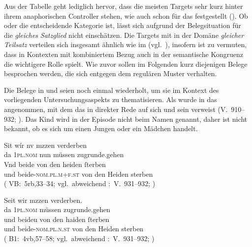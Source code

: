 Aus der Tabelle geht lediglich hervor, dass die meisten Targets sehr kurz
hinter ihrem anaphorischen Controller stehen, wie auch schon für das
\CAO{} festgestellt (). Ob  oder
 die entscheidende Kategorie ist, lässt sich aufgrund der
Belegsituation für die  \emph{gleiches Satzglied} nicht
einschätzen. Die Targets mit  in der Domäne \emph{gleicher
Teilsatz} verteilen sich insgesamt ähnlich wie im
\CAO{} (vgl.~), insofern ist zu vermuten, dass in
Kontexten mit kombiniertem Bezug auch in der \KC{} semantische
Kongruenz die wichtigere Rolle spielt. Wie zuvor
sollen im Folgenden kurz diejenigen Belege besprochen werden, die sich entgegen
dem regulären Muster verhalten.

Die Belege in  und  seien noch einmal
wiederholt, um sie im Kontext des vorliegenden Unter\-suchungsaspekts zu
thematisieren. Als  wurde in  das
   angenommen, mit dem das 
 in direkter Rede auf sich und sein  
verweist (V.~910--932; \cite[98]{schroeder1895}). Das Kind wird in der Episode
nicht beim Namen genannt, daher ist nicht bekannt, ob es sich um einen Jungen
oder ein Mädchen handelt.

\begin{exe}
\ex \label{ex:wipkindelin2}
	\begin{xlist}
	\ex \label{ex:wipkindelin2_1}
		\gll Sit wír nv mzzen verderben \\
			da \textsc{1pl\tsub{\SF/\SX}.nom} nun müssen zugrunde.gehen \\
	\sn \gll Vnd beide von den heiden ſterben \\
			und beide-\textsc{nom.pl.m+f\tsub{\SF/\SX}.st} von den Heiden
				sterben \\
		\trans {}
			(%
				VB:~5rb,33--34; vgl.~abweichend
				\KC:~V.~931--932;
				\cite[98]{schroeder1895}%
			)
		
	\ex \label{ex:wipkindelin2_2}
		\gll Seit wir mzzen verderben. \\
			da \textsc{1pl\tsub{\SF/\SX}.nom} müssen zugrunde.gehen \\
	\sn \gll und beideu von den haiden ſterben \\
			und beide-\textsc{nom.pl.n\tsub{\SF/\SX}.st} von den Heiden
				sterben \\
		\trans {}
			(%
				B1:~4vb,57--58; vgl.~abweichend
				\KC:~V.~931--932;
				\cite[98]{schroeder1895}%
			)
	\end{xlist}%
\end{exe}

